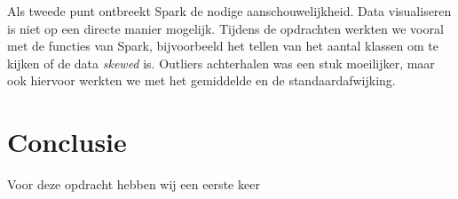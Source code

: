 \documentclass[a4paper,10pt,twoside]{report}
\begin{document}
Als tweede punt ontbreekt Spark de nodige aanschouwelijkheid. Data visualiseren is niet op een directe manier mogelijk. Tijdens de opdrachten werkten we vooral met de functies van Spark, bijvoorbeeld het tellen van het aantal klassen om te kijken of de data \textit{skewed} is. Outliers achterhalen was een stuk moeilijker, maar ook hiervoor werkten we met het gemiddelde en de standaardafwijking.

\chapter{Conclusie}

Voor deze opdracht hebben wij een eerste keer 

\appendix
\end{document}
